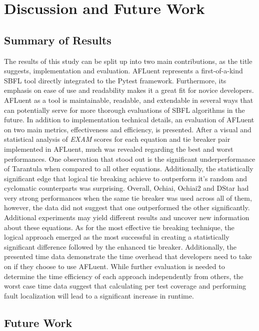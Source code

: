 \chapter{Discussion and Future Work}
\label{ch:conclusion}

\section{Summary of Results}

The results of this study can be split up into two main contributions, as the
title suggests, implementation and evaluation. AFLuent represents a first-of-a-kind SBFL tool directly integrated to the Pytest framework. Furthermore, its
emphasis on ease of use and readability makes it a great fit for
novice developers. AFLuent as a tool is maintainable, readable, and extendable
in several ways that can potentially serve for more thorough evaluations
of SBFL algorithms in the future. In addition to implementation technical
details, an evaluation of AFLuent on two main metrics, effectiveness and
efficiency, is presented. After a visual and statistical analysis of \emph{EXAM} scores for each equation
and tie breaker pair implemented in AFLuent, much was revealed regarding the
best and worst performances. One observation that stood out
is the significant underperformance of Tarantula when compared to all other
equations. Additionally, the statistically significant edge that logical tie
breaking achieve to outperform it's random and cyclomatic counterparts was
surprising. Overall, Ochiai, Ochiai2 and DStar had very strong performances
when the same tie breaker was used across all of them, however, the data did not
suggest that one outperformed the other significantly. Additional experiments may
yield different results and uncover new information about these equations. As for the most effective tie breaking technique, the
logical approach emerged as the most successful in creating a statistically
significant difference followed by the enhanced tie breaker.
Additionally, the presented time data demonstrate the
time overhead that developers need to take on if they choose to use
AFLuent. While further evaluation is needed to determine the time efficiency of
each approach independently from others, the worst case time data suggest that
calculating per test coverage and performing fault localization will lead to a
significant increase in runtime.

\section{Future Work}
\label{sec:future_work}

